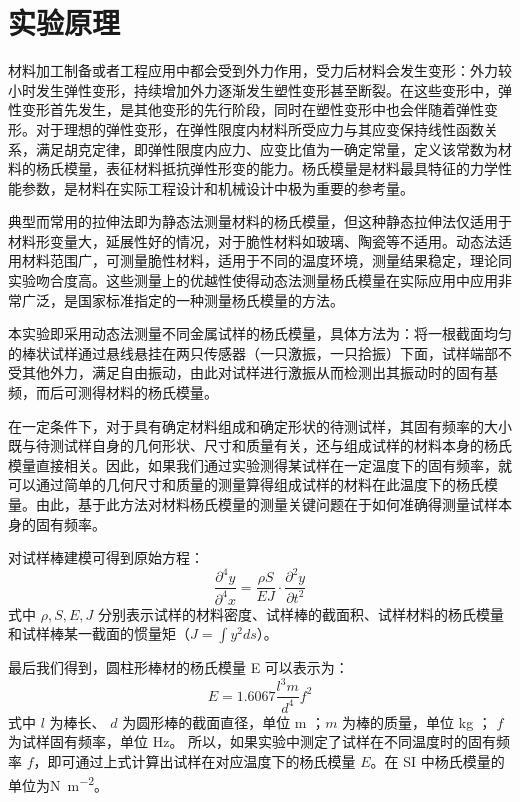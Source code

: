 \documentclass[a4paper,utf8]{article}
\begin{document}
\section{实验原理}%
    材料加工制备或者工程应用中都会受到外力作用，受力后材料会发生变形：外力较小时发生弹性变形，持续增加外力逐渐发生塑性变形甚至断裂。在这些变形中，弹性变形首先发生，是其他变形的先行阶段，同时在塑性变形中也会伴随着弹性变形。对于理想的弹性变形，在弹性限度内材料所受应力与其应变保持线性函数关系，满足胡克定律，即弹性限度内应力、应变比值为一确定常量，定义该常数为材料的杨氏模量，表征材料抵抗弹性形变的能力。杨氏模量是材料最具特征的力学性能参数，是材料在实际工程设计和机械设计中极为重要的参考量。\par
    典型而常用的拉伸法即为静态法测量材料的杨氏模量，但这种静态拉伸法仅适用于材料形变量大，延展性好的情况，对于脆性材料如玻璃、陶瓷等不适用。动态法适用材料范围广，可测量脆性材料，适用于不同的温度环境，测量结果稳定，理论同实验吻合度高。这些测量上的优越性使得动态法测量杨氏模量在实际应用中应用非常广泛，是国家标准指定的一种测量杨氏模量的方法。\par
    本实验即采用动态法测量不同金属试样的杨氏模量，具体方法为：将一根截面均匀的棒状试样通过悬线悬挂在两只传感器（一只激振，一只拾振）下面，试样端部不受其他外力，满足自由振动，由此对试样进行激振从而检测出其振动时的固有基频，而后可测得材料的杨氏模量。\par
    在一定条件下，对于具有确定材料组成和确定形状的待测试样，其固有频率的大小既与待测试样自身的几何形状、尺寸和质量有关，还与组成试样的材料本身的杨氏模量直接相关。因此，如果我们通过实验测得某试样在一定温度下的固有频率，就可以通过简单的几何尺寸和质量的测量算得组成试样的材料在此温度下的杨氏模量。由此，基于此方法对材料杨氏模量的测量关键问题在于如何准确得测量试样本身的固有频率。\par
    对试样棒建模可得到原始方程：
    \begin{equation}
        \frac{\partial^4y}{\partial^4x}=\frac{\rho S}{EJ}\cdot\frac{\partial^2y}{\partial t^2}
    \end{equation}
    式中 $\rho,S,E,J$ 分别表示试样的材料密度、试样棒的截面积、试样材料的杨氏模量和试样棒某一截面的惯量矩（$J=\int y^2ds$）。\par
    最后我们得到，圆柱形棒材的杨氏模量 E 可以表示为：
    \begin{equation}
        E=1.6067\frac{l^3m}{d^4}f^2\label{eq:2}
    \end{equation}
    式中 $l$ 为棒长、 $d$ 为圆形棒的截面直径，单位 \unit{\m} ；$m$ 为棒的质量，单位 \unit{\kg} ； $f$为试样固有频率，单位 \unit{\Hz}。 所以，如果实验中测定了试样在不同温度时的固有频率 $f$，即可通过上式计算出试样在对应温度下的杨氏模量 $E$。在 SI 中杨氏模量的单位为\unit{\N\per\m^2}。\par
\end{document}
